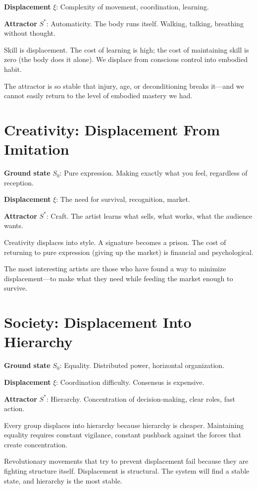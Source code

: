 \documentclass[12pt]{article}
\theoremstyle{definition}
\theoremstyle{remark}
\begin{document}
\textbf{Displacement} $\xi$: Complexity of movement, coordination, learning.

\textbf{Attractor} $S^*$: Automaticity. The body runs itself. Walking, talking, breathing without thought.

Skill is displacement. The cost of learning is high; the cost of maintaining skill is zero (the body does it alone). We displace from conscious control into embodied habit.

The attractor is so stable that injury, age, or deconditioning breaks it—and we cannot easily return to the level of embodied mastery we had.

\section{Creativity: Displacement From Imitation}

\textbf{Ground state} $S_0$: Pure expression. Making exactly what you feel, regardless of reception.

\textbf{Displacement} $\xi$: The need for survival, recognition, market.

\textbf{Attractor} $S^*$: Craft. The artist learns what sells, what works, what the audience wants.

Creativity displaces into style. A signature becomes a prison. The cost of returning to pure expression (giving up the market) is financial and psychological.

The most interesting artists are those who have found a way to minimize displacement—to make what they need while feeding the market enough to survive.

\section{Society: Displacement Into Hierarchy}

\textbf{Ground state} $S_0$: Equality. Distributed power, horizontal organization.

\textbf{Displacement} $\xi$: Coordination difficulty. Consensus is expensive.

\textbf{Attractor} $S^*$: Hierarchy. Concentration of decision-making, clear roles, fast action.

Every group displaces into hierarchy because hierarchy is cheaper. Maintaining equality requires constant vigilance, constant pushback against the forces that create concentration.

Revolutionary movements that try to prevent displacement fail because they are fighting structure itself. Displacement is structural. The system will find a stable state, and hierarchy is the most stable.
\end{document}
